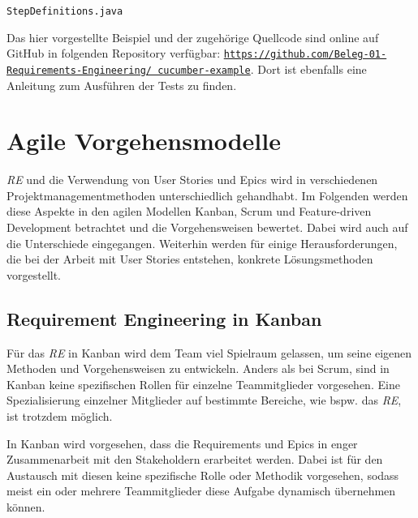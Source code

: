 \documentclass[acmtog]{acmart}
\begin{document}
\begin{listing}[!ht]
	\begin{tcolorbox}[colframe=black, colback=white, opacityback=1.0, sharp corners, boxrule=.4pt, width=\linewidth-4pt]
		\inputminted[linenos, firstline=9, breakafter=_, xleftmargin=2pt, numbersep=6pt, frame=none]{java}{cucumber/StepDefinitions.java}
		\vspace{-1em}
	\end{tcolorbox}
	\vspace{-1em}
	\caption{\texttt{StepDefinitions.java}}
	\label{listing:2}
\end{listing}

Das hier vorgestellte Beispiel und der zugehörige Quellcode sind online auf GitHub in folgenden Repository verfügbar:
\href{https://github.com/Beleg-01-Requirements-Engineering/cucumber-example}{\texttt{https://github.com/Beleg-01-Requirements-Engineering/
		cucumber-example}}.
Dort ist ebenfalls eine Anleitung zum Ausführen der Tests zu finden.


\section{Agile Vorgehensmodelle}

\emph{RE} und die Verwendung von User Stories und Epics wird in verschiedenen Projektmanagementmethoden unterschiedlich gehandhabt. Im Folgenden werden 
diese Aspekte in den agilen Modellen Kanban, Scrum und Feature-driven Development betrachtet und die Vorgehensweisen bewertet. Dabei wird auch auf die Unterschiede eingegangen. 
Weiterhin werden für einige Herausforderungen, die bei der Arbeit mit User Stories entstehen, konkrete Lösungsmethoden vorgestellt.

\subsection{Requirement Engineering in Kanban}

Für das \emph{RE} in Kanban wird dem Team viel Spielraum gelassen, 
um seine eigenen Methoden und Vorgehensweisen zu entwickeln. Anders als bei Scrum, sind 
in Kanban keine spezifischen Rollen für einzelne Teammitglieder vorgesehen. Eine 
Spezialisierung einzelner Mitglieder auf bestimmte Bereiche, wie bspw. das \emph{RE}, ist trotzdem 
möglich.

In Kanban wird vorgesehen, dass die Requirements und Epics in enger Zusammenarbeit mit 
den Stakeholdern erarbeitet werden. Dabei ist für den Austausch mit diesen keine 
spezifische Rolle oder Methodik vorgesehen, sodass meist ein oder mehrere Teammitglieder 
diese Aufgabe dynamisch übernehmen können. \cite{agileprocesses}
\end{document}
